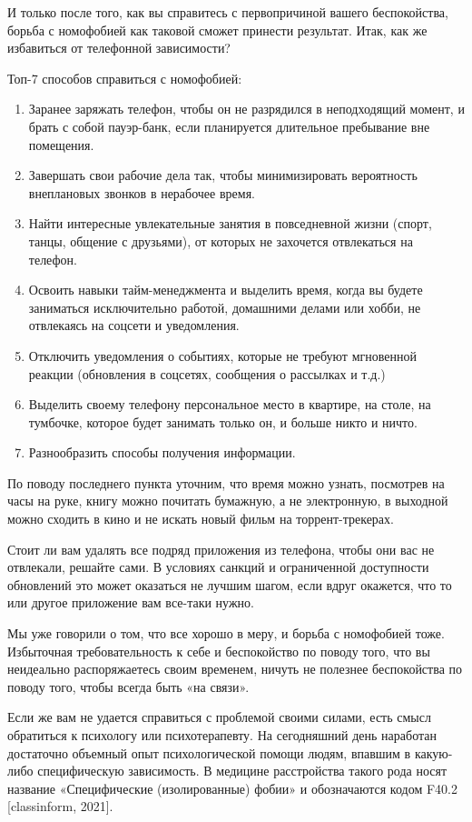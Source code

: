 И только после того, как вы справитесь с первопричиной вашего беспокойства, борьба с номофобией как таковой сможет принести результат. Итак, как же избавиться от телефонной зависимости?

Топ-7 способов справиться с номофобией:
\begin{enumerate}
    \item Заранее заряжать телефон, чтобы он не разрядился в неподходящий момент, и брать с собой пауэр-банк, если планируется длительное пребывание вне помещения.
    \item Завершать свои рабочие дела так, чтобы минимизировать вероятность внеплановых звонков в нерабочее время.
    \item Найти интересные увлекательные занятия в повседневной жизни (спорт, танцы, общение с друзьями), от которых не захочется отвлекаться на телефон.
    \item Освоить навыки тайм-менеджмента и выделить время, когда вы будете заниматься исключительно работой, домашними делами или хобби, не отвлекаясь на соцсети и уведомления.
    \item Отключить уведомления о событиях, которые не требуют мгновенной реакции (обновления в соцсетях, сообщения о рассылках и т.д.)
    \item Выделить своему телефону персональное место в квартире, на столе, на тумбочке, которое будет занимать только он, и больше никто и ничто.
    \item Разнообразить способы получения информации.
\end{enumerate}

По поводу последнего пункта уточним, что время можно узнать, посмотрев на часы на руке, книгу можно почитать бумажную, а не электронную, в выходной можно сходить в кино и не искать новый фильм на торрент-трекерах.

Стоит ли вам удалять все подряд приложения из телефона, чтобы они вас не отвлекали, решайте сами. В условиях санкций и ограниченной доступности обновлений это может оказаться не лучшим шагом, если вдруг окажется, что то или другое приложение вам все-таки нужно.

Мы уже говорили о том, что все хорошо в меру, и борьба с номофобией тоже. Избыточная требовательность к себе и беспокойство по поводу того, что вы неидеально распоряжаетесь своим временем, ничуть не полезнее беспокойства по поводу того, чтобы всегда быть «на связи».

Если же вам не удается справиться с проблемой своими силами, есть смысл обратиться к психологу или психотерапевту. На сегодняшний день наработан достаточно объемный опыт психологической помощи людям, впавшим в какую-либо специфическую зависимость. В медицине расстройства такого рода носят название «Специфические (изолированные) фобии» и обозначаются кодом F40.2 [classinform, 2021].

